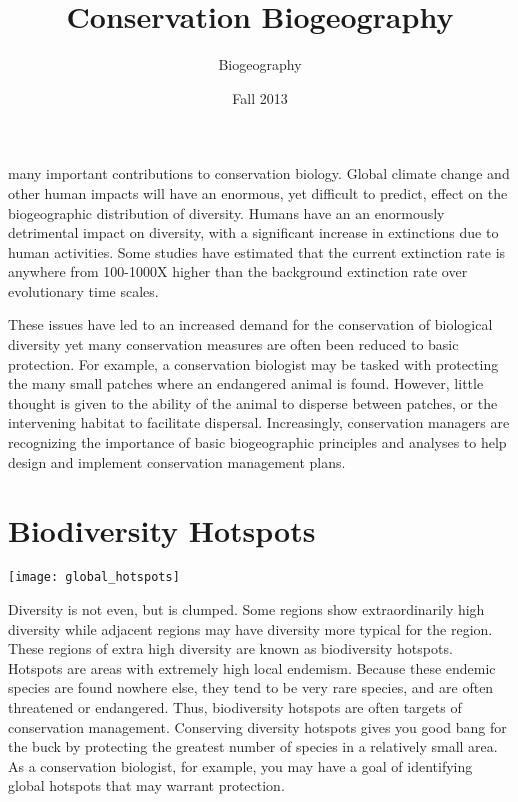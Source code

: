 \documentclass[letterpaper]{tufte-handout}
\title{Conservation Biogeography}
\author[Biogeography]{Biogeography}
\date{Fall 2013} %
\begin{document}
\maketitle	%



 many important contributions to conservation biology. Global climate change and other human impacts will have an enormous, yet difficult to predict, effect on the biogeographic distribution of diversity.  Humans have an an enormously detrimental impact on diversity, with a significant increase in extinctions due to human activities. Some studies have estimated that the current extinction rate is anywhere from 100-1000X higher than the background extinction rate over evolutionary time scales.

These issues have led to an increased demand for the conservation of biological diversity yet many conservation measures are often been reduced to basic protection.  For example, a conservation biologist may be tasked with protecting the many small patches where an endangered animal is found. However, little thought is given to the ability of the animal to disperse between patches, or the intervening habitat to facilitate dispersal. Increasingly, conservation managers are recognizing the importance of basic biogeographic principles and analyses to help design and implement conservation management plans.


\section{Biodiversity Hotspots}
\begin{marginfigure}%
	\texttt{[image: global\_hotspots]}
\end{marginfigure} 

Diversity is not even, but is clumped.  Some regions show extraordinarily high diversity while adjacent regions may have diversity more typical for the region. These regions of extra high diversity are known as biodiversity hotspots.  Hotspots are areas with extremely high local endemism.  Because these  endemic species are found nowhere else, they tend to be very rare species, and are often threatened or endangered.  Thus, biodiversity hotspots are often targets of conservation management.  Conserving diversity hotspots gives you good bang for the buck by protecting the greatest number of species in a relatively small area. As a conservation biologist, for example, you may have a goal of identifying global hotspots that may warrant protection.
\end{document}
